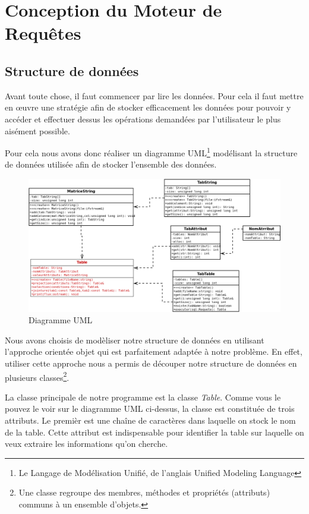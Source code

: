\documentclass[oneside,13pt,a4paper]{report}
\begin{document}

\chapter{Conception du Moteur de Requêtes}

\section{Structure de données}
Avant toute chose, il faut commencer par lire les données. Pour cela il faut mettre en \oe uvre une stratégie afin de stocker efficacement les données pour pouvoir 
y accéder et effectuer dessus les opérations demandées par l’utilisateur le plus aisément possible.

Pour cela nous avons donc réaliser un diagramme UML\footnote{Le Langage de Modélisation Unifié, de l'anglais Unified Modeling Language} modélisant la structure de données utilisée afin de stocker  l’ensemble des données.

\begin{figure}[h!]
	\includegraphics[width=1\textwidth]{img/sql.png}\par
	\vspace{0.1cm}
	\caption{Diagramme UML}
\end{figure}

Nous avons choisis de modèliser notre structure de données en utilisant l'approche orientée objet qui est parfaitement adaptée à notre problème. En effet, 
utiliser cette approche nous a permis de découper notre structure de données en plusieurs classes\footnote{Une classe regroupe des membres, méthodes et propriétés (attributs) communs à un ensemble d'objets.}.

La classe principale de notre programme est la classe \textit{Table}. 
Comme vous le pouvez le voir sur le diagramme UML ci-dessus, 
la classe est constituée de trois attributs. Le premièr est une chaîne de caractères dans laquelle on stock le nom de la table. 
Cette attribut est indispensable pour identifier la table sur laquelle on veux extraire les informations qu’on cherche.
\end{document}
